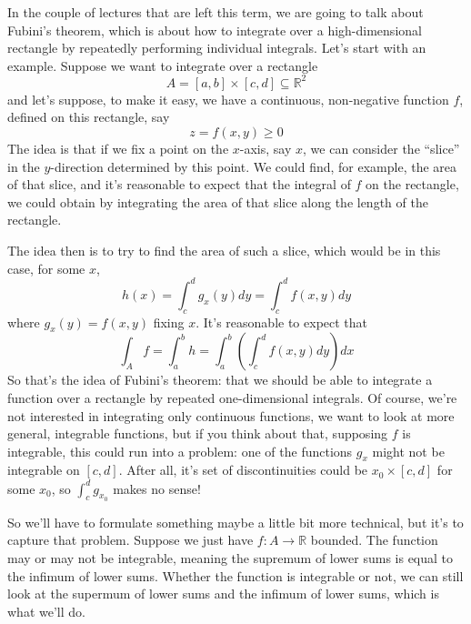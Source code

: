 \documentclass{article}
\newcommand{\reals}[0]{\mathbb{R}}
\begin{document}
In the couple of lectures that are left this term, we are going to talk about Fubini's theorem, which is about how to integrate over a high-dimensional rectangle by repeatedly performing individual integrals. Let's start with an example. Suppose we want to integrate over a rectangle \begin{equation}
  A = [a, b] \times [c, d] \subseteq \reals^2
\end{equation}
and let's suppose, to make it easy, we have a continuous, non-negative function \(f\), defined on this rectangle, say
\begin{equation}z = f(x, y) \geq 0\end{equation}
The idea is that if we fix a point on the \(x\)-axis, say \(x\), we can consider the ``slice'' in the \(y\)-direction determined by this point. We could find, for example, the area of that slice, and it's reasonable to expect that the integral of \(f\) on the rectangle, we could obtain by integrating the area of that slice along the length of the rectangle.

The idea then is to try to find the area of such a slice, which would be in this case, for some \(x\),
\begin{equation}h(x) = \int_c^dg_x(y)dy = \int_c^df(x, y)dy\end{equation}
where \(g_x(y) = f(x, y)\) fixing \(x\). It's reasonable to expect that
\begin{equation}\int_Af = \int_a^bh = \int_a^b\left(\int_c^df(x, y)dy\right)dx\end{equation}
So that's the idea of Fubini's theorem: that we should be able to integrate a function over a rectangle by repeated one-dimensional integrals. Of course, we're not interested in integrating only continuous functions, we want to look at more general, integrable functions, but if you think about that, supposing \(f\) is integrable, this could run into a problem: one of the functions \(g_x\) might not be integrable on \([c, d]\). After all, it's set of discontinuities could be \(x_0 \times [c, d]\) for some \(x_0\), so \(\int_c^dg_{x_0}\) makes no sense!

So we'll have to formulate something maybe a little bit more technical, but it's to capture that problem. Suppose we just have \(f: A \to \reals\) bounded. The function may or may not be integrable, meaning the supremum of lower sums is equal to the infimum of lower sums. Whether the function is integrable or not, we can still look at the supermum of lower sums and the infimum of lower sums, which is what we'll do.
\end{document}
